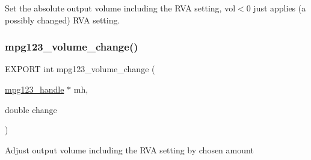 Set the absolute output volume including the R\+VA setting, vol$<$0 just applies (a possibly changed) R\+VA setting. \mbox{\label{group__mpg123__voleq_gaae358b14b2f7f2d66af48b484a0de1db}} 
\subsubsection{\texorpdfstring{mpg123\+\_\+volume\+\_\+change()}{mpg123\_volume\_change()}}
{\footnotesize\ttfamily E\+X\+P\+O\+RT int mpg123\+\_\+volume\+\_\+change (\begin{DoxyParamCaption}\item[{\hyperlink{group__mpg123__init_ga6728e2839a395f3a07d4514da659faca}{mpg123\+\_\+handle} $\ast$}]{mh,  }\item[{double}]{change }\end{DoxyParamCaption})}

Adjust output volume including the R\+VA setting by chosen amount 